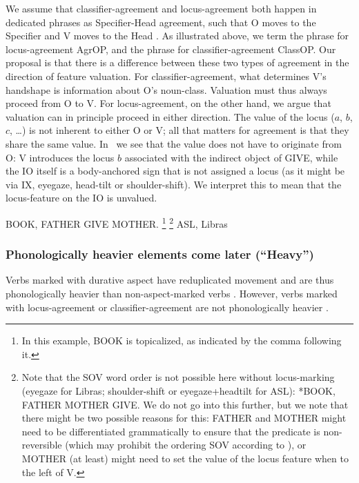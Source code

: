 \documentclass[output=paper,colorlinks,citecolor=brown,
]{langscibook}
\begin{document}
We assume that classifier-agreement and locus-agreement both
happen in dedicated phrases as Specifier-Head agreement, such that O
moves to the Specifier and V moves to the Head \citep{Benedicto.Brentari.2004,Kuhn.2016}. 
As illustrated above, we term the phrase
for locus-agreement AgrOP, and the phrase for classifier-agreement
ClassOP. Our proposal is that there is a difference between these two types
of agreement in the direction of feature valuation. For
classifier-agreement, what determines V’s handshape is information
about O’s noun-class. Valuation must thus always proceed from O to
V. For locus-agreement, on the other hand, we argue that valuation can
in principle proceed in either direction. The value of the locus ($a$, $b$, $c$,
\ldots) is not inherent to either O or V; all that matters for agreement is
that they share the same value. In~ we see that the value does not
have to originate from O: V introduces the locus $b$ associated with the
indirect object of GIVE, while the IO itself is a body-anchored sign
that is not assigned a locus (as it might be via IX, eyegaze, head-tilt or
shoulder-shift). We interpret this to mean that the locus-feature on the
IO is unvalued.

\ea 
    \label{lasz:ex:12}
    BOOK, FATHER GIVE MOTHER.%
    \footnote{
        In this example, BOOK is topicalized, as indicated by the comma
        following it.
    }%
    \footnote{
        Note that the SOV word order is not possible here without locus-marking
        (eyegaze for Libras; shoulder-shift or eyegaze+headtilt for ASL):
        \ea 
            *BOOK, FATHER MOTHER GIVE.
        \z 
        We do not go into this further, but we note that there might be two possible reasons
        for this: FATHER and MOTHER might need to be differentiated grammatically to
        ensure that the predicate is non-reversible (which may prohibit the ordering SOV
        according to \citealp{Fischer.1974}), or MOTHER (at least) might need to set the value of the
        locus feature when to the left of V.
    }
    \hfill 
    \cmark ASL,
    \cmark Libras 
    \\
\z 

\subsubsection{Phonologically heavier elements come later (``Heavy'')}

Verbs marked with durative aspect have reduplicated movement
\citep{Klima.Bellugi.1979} and are thus phonologically heavier than
non-aspect-marked verbs \citep{Brentari.1998}. However, verbs marked
with locus-agreement or classifier-agreement are not phonologically
heavier \citep{Brentari.1998}.
\end{document}
